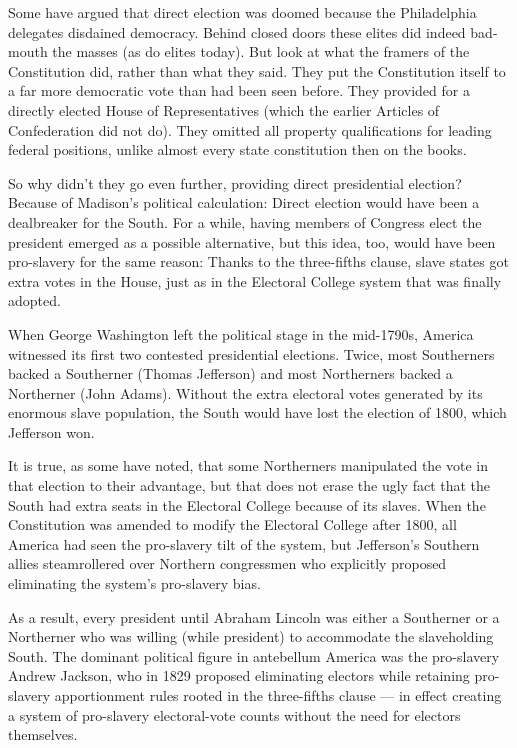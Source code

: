 Some have argued that direct election was doomed because the
Philadelphia delegates disdained democracy. Behind closed doors these
elites did indeed bad-mouth the masses (as do elites today). But look at
what the framers of the Constitution did, rather than what they said.
They put the Constitution itself to a far more democratic vote than had
been seen before. They provided for a directly elected House of
Representatives (which the earlier Articles of Confederation did not
do). They omitted all property qualifications for leading federal
positions, unlike almost every state constitution then on the books.

So why didn't they go even further, providing direct presidential
election? Because of Madison's political calculation: Direct election
would have been a dealbreaker for the South. For a while, having members
of Congress elect the president emerged as a possible alternative, but
this idea, too, would have been pro-slavery for the same reason: Thanks
to the three-fifths clause, slave states got extra votes in the House,
just as in the Electoral College system that was finally adopted.

When George Washington left the political stage in the mid-1790s,
America witnessed its first two contested presidential elections. Twice,
most Southerners backed a Southerner (Thomas Jefferson) and most
Northerners backed a Northerner (John Adams). Without the extra
electoral votes generated by its enormous slave population, the South
would have lost the election of 1800, which Jefferson won.

It is true, as some have noted, that some Northerners manipulated the
vote in that election to their advantage, but that does not erase the
ugly fact that the South had extra seats in the Electoral College
because of its slaves. When the Constitution was amended to modify the
Electoral College after 1800, all America had seen the pro-slavery tilt
of the system, but Jefferson's Southern allies steamrollered over
Northern congressmen who explicitly proposed eliminating the system's
pro-slavery bias.

As a result, every president until Abraham Lincoln was either a
Southerner or a Northerner who was willing (while president) to
accommodate the slaveholding South. The dominant political figure in
antebellum America was the pro-slavery Andrew Jackson, who in 1829
proposed eliminating electors while retaining pro-slavery apportionment
rules rooted in the three-fifths clause --- in effect creating a system
of pro-slavery electoral-vote counts without the need for electors
themselves.

